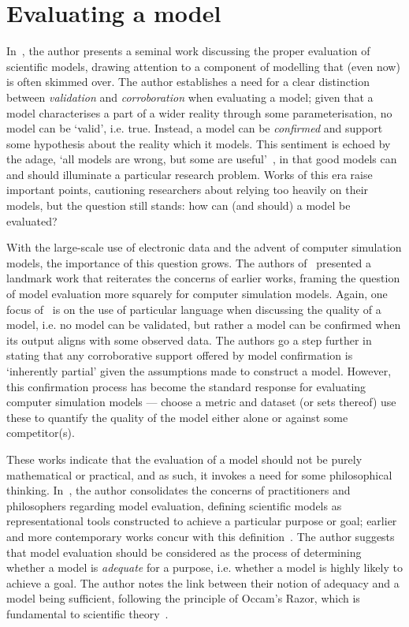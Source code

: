 \section{Evaluating a model}

In~\cite{Caswell1976}, the author presents a seminal work discussing the proper
evaluation of scientific models, drawing attention to a component of modelling
that (even now) is often skimmed over. The author establishes a need for a clear
distinction between \emph{validation} and \emph{corroboration} when evaluating a
model; given that a model characterises a part of a wider reality through some
parameterisation, no model can be `valid', i.e. true. Instead, a model can be
\emph{confirmed} and support some hypothesis about the reality which it models.
This sentiment is echoed by the adage, `all models are wrong, but some are
useful'~\cite{Box1979}, in that good models can and should illuminate a
particular research problem. Works of this era raise important points,
cautioning researchers about relying too heavily on their models, but the
question still stands: how can (and should) a model be evaluated?

With the large-scale use of electronic data and the advent of computer
simulation models, the importance of this question grows. The authors
of~\cite{Oreskes1994} presented a landmark work that reiterates the concerns of
earlier works, framing the question of model evaluation more squarely for
computer simulation models. Again, one focus of~\cite{Oreskes1994} is on the use
of particular language when discussing the quality of a model, i.e. no model can
be validated, but rather a model can be confirmed when its output aligns with
some observed data. The authors go a step further in stating that any
corroborative support offered by model confirmation is `inherently partial'
given the assumptions made to construct a model. However, this confirmation
process has become the standard response for evaluating computer simulation
models --- choose a metric and dataset (or sets thereof) use these to quantify
the quality of the model either alone or against some competitor(s).

These works indicate that the evaluation of a model should not be purely
mathematical or practical, and as such, it invokes a need for some philosophical
thinking. In~\cite{Parker2010}, the author consolidates the concerns of
practitioners and philosophers regarding model evaluation, defining scientific
models as representational tools constructed to achieve a particular purpose or
goal; earlier and more contemporary works concur with this
definition~\cite{Baumberger2017,Caswell1976,Currie2017}. The author suggests
that model evaluation should be considered as the process of determining whether
a model is \emph{adequate} for a purpose, i.e. whether a model is highly likely
to achieve a goal. The author notes the link between their notion of adequacy
and a model being sufficient, following the principle of Occam's Razor, which is
fundamental to scientific theory~\cite{Walsh1979}.


